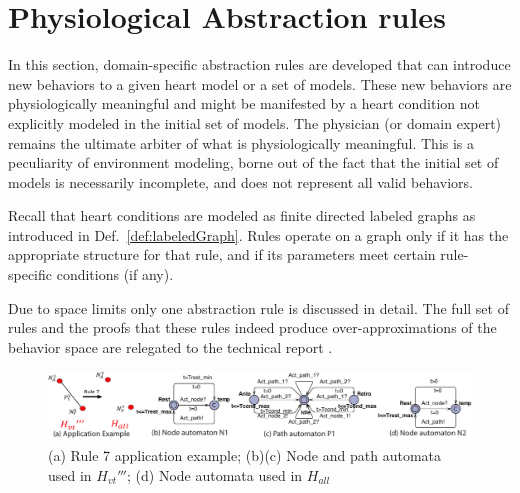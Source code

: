 \section{Physiological Abstraction rules}
\label{abstractionRules} 
In this section, domain-specific abstraction rules are developed that can introduce new behaviors to a given heart model or a set of models. 
These new behaviors are physiologically meaningful and might be manifested by a heart condition not explicitly modeled in the initial set of models.
The physician (or domain expert) remains the ultimate arbiter of what is physiologically meaningful.
This is a peculiarity of environment modeling, borne out of the fact that the initial set of models is necessarily incomplete, and does not represent all valid behaviors.

Recall that heart conditions are modeled as finite directed labeled graphs as introduced in Def.~\ref{def:labeledGraph}.
Rules operate on a graph only if it has the appropriate structure for that rule, and if its parameters meet certain rule-specific conditions (if any).

{}
{Due to space limits only one abstraction rule is discussed in detail. The full set of rules and the proofs that these rules indeed produce over-approximations of the behavior space are relegated to the technical report \cite{regar_tech}.}
{}
{}
%
%
{}
{}


%



\begin{figure}[!b]
	\centering
	\includegraphics[width=1.05\textwidth]{figs/rule5.pdf}
	\caption{\small (a) Rule 7 application example; (b)(c) Node and path automata used in $H_{vt}'''$; (d) Node automata used in $H_{all}$ }
	\vspace{-15pt}
	\label{fig:rule5}
\end{figure}

